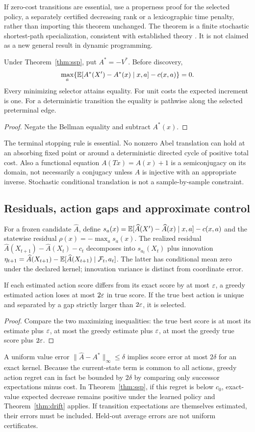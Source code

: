 \documentclass[11pt]{article}
\theoremstyle{definition}\newtheorem{definition}[theorem]{Definition}\newtheorem{example}[theorem]{Example}\newtheorem{conjecture}[theorem]{Conjecture}
\begin{document}
If zero-cost transitions are essential, use a properness proof for the selected policy, a separately certified decreasing rank or a lexicographic time penalty, rather than importing this theorem unchanged. The theorem is a finite stochastic shortest-path specialization, consistent with established theory \cite{ssp}. It is not claimed as a new general result in dynamic programming.
\begin{corollary}
Under Theorem~\ref{thm:ssp}, put $A^*=-V^*$. Before discovery,
\[\max_a\{\mathbb E[A^*(X')-A^*(x)\mid x,a]-c(x,a)\}=0.\]
Every minimizing selector attains equality. For unit costs the expected increment is one. For a deterministic transition the equality is pathwise along the selected preterminal edge.
\end{corollary}
\begin{proof} Negate the Bellman equality and subtract $A^*(x)$.\end{proof}
The terminal stopping rule is essential. No nonzero Abel translation can hold at an absorbing fixed point or around a deterministic directed cycle of positive total cost. Also a functional equation $A(Tx)=A(x)+1$ is a semiconjugacy on its domain, not necessarily a conjugacy unless $A$ is injective with an appropriate inverse. Stochastic conditional translation is not a sample-by-sample constraint.
\subsection{Residuals, action gaps and approximate control}
For a frozen candidate $\widehat A$, define $s_a(x)=\mathbb E[\widehat A(X')-\widehat A(x)\mid x,a]-c(x,a)$ and the statewise residual $\rho(x)=-\max_a s_a(x)$. The realized residual $\widehat A(X_{t+1})-\widehat A(X_t)-c_t$ decomposes into $s_{a_t}(X_t)$ plus innovation $\eta_{t+1}=\widehat A(X_{t+1})-\mathbb E[\widehat A(X_{t+1})\mid\mathcal F_t,a_t]$. The latter has conditional mean zero under the declared kernel; innovation variance is distinct from coordinate error.
\begin{proposition}
If each estimated action score differs from its exact score by at most $\varepsilon$, a greedy estimated action loses at most $2\varepsilon$ in true score. If the true best action is unique and separated by a gap strictly larger than $2\varepsilon$, it is selected.
\end{proposition}
\begin{proof} Compare the two maximizing inequalities: the true best score is at most its estimate plus $\varepsilon$, at most the greedy estimate plus $\varepsilon$, at most the greedy true score plus $2\varepsilon$.\end{proof}
A uniform value error $\|\widehat A-A^*\|_\infty\le\delta$ implies score error at most $2\delta$ for an exact kernel. Because the current-state term is common to all actions, greedy action regret can in fact be bounded by $2\delta$ by comparing only successor expectations minus cost. In Theorem~\ref{thm:ssp}, if this regret is below $c_0$, exact-value expected decrease remains positive under the learned policy and Theorem~\ref{thm:drift} applies. If transition expectations are themselves estimated, their errors must be included. Held-out average errors are not uniform certificates.
\end{document}
